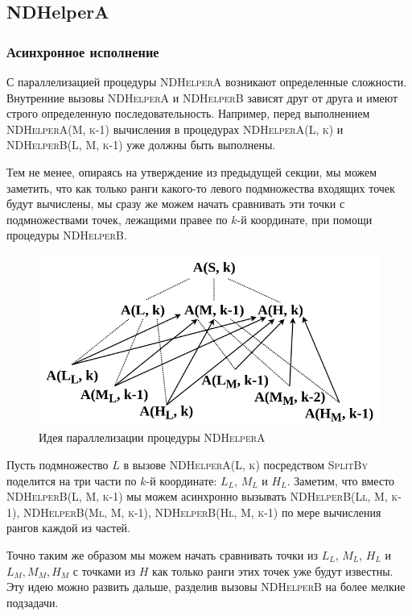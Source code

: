 \subsection{NDHelperA}
\subsubsection{Асинхронное исполнение}
С параллелизацией процедуры \textsc{NDHelperA} возникают определенные сложности.
Внутренние вызовы \textsc{NDHelperA} и \textsc{NDHelperB} зависят друг от друга и имеют строго определенную последовательность. 
Например, перед выполнением \textsc{NDHelperA(M, k-1)} вычисления в процедурах \textsc{NDHelperA(L, k)} и \textsc{NDHelperB(L, M, k-1)} уже должны быть выполнены.

Тем не менее, опираясь на утверждение из предыдущей секции, мы можем заметить, что как только ранги какого-то левого подмножества входящих точек будут вычислены, мы сразу же можем начать сравнивать эти точки с подмножествами точек, лежащими правее по $k$-й координате, при помощи процедуры \textsc{NDHelperB}.

\begin{figure}[h]
\centering
\includegraphics[width=\textwidth]{images/async_calls.png}
\caption{Идея параллелизации процедуры \textsc{NDHelperA}}
\end{figure}

Пусть подмножество $L$ в вызове \textsc{NDHelperA(L, k)} посредством \textsc{SplitBy} поделится на три части по $k$-й координате: $L_L$, $M_L$ и $H_L$.
Заметим, что вместо \textsc{NDHelperB(L, M, k-1)} мы можем асинхронно вызывать \textsc{NDHelperB(Ll, M, k-1)}, \textsc{NDHelperB(Ml, M, k-1)}, \textsc{NDHelperB(Hl, M, k-1)} по мере вычисления рангов каждой из частей.

Точно таким же образом мы можем начать сравнивать точки из $L_L$, $M_L$, $H_L$ и $L_M, M_M, H_M$ с точками из $H$ как только ранги этих точек уже будут известны.
Эту идею можно развить дальше, разделив вызовы \textsc{NDHelperB} на более мелкие подзадачи.

